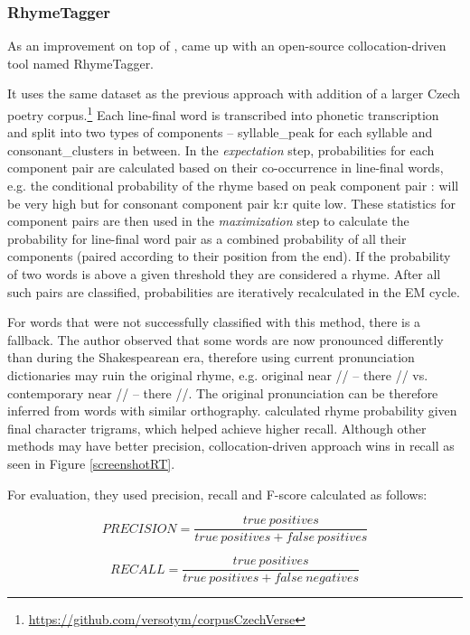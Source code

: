 \subsubsection*{RhymeTagger}
As an improvement on top of \cite{reddy2011unsupervised}, \cite{plechavc2018collocation} came up with an open-source collocation-driven tool named RhymeTagger.

It uses the same dataset as the previous approach with addition of a larger Czech poetry corpus.\footnote{\url{https://github.com/versotym/corpusCzechVerse}}
Each line-final word is transcribed into phonetic transcription and split into two types of components -- \gls{syllable_peak} for each syllable and \gls{consonant_clusters} in between. In the \textit{expectation} step, probabilities for each component pair are calculated based on their co-occurrence in line-final words, e.g. the conditional probability of the rhyme based on peak component pair : will be very high but for consonant component pair k:r quite low. These statistics for component pairs are then used in the \textit{maximization} step to calculate the probability for line-final word pair as a combined probability of all their components (paired according to their position from the end). If the probability of two words is above a given threshold they are considered a rhyme. After all such pairs are classified, probabilities are iteratively recalculated in the EM cycle. 

For words that were not successfully classified with this method, there is a fallback. The author observed that some words are now pronounced differently than during the Shakespearean era, therefore using current pronunciation dictionaries may ruin the original rhyme, e.g. original near // -- there // vs. contemporary near // -- there //. The original pronunciation can be therefore inferred from words with similar orthography. \citeauthor{plechavc2018collocation} calculated rhyme probability given final character trigrams, which helped achieve higher recall. Although other methods may have better precision, collocation-driven approach wins in recall as seen in Figure \ref{screenshotRT}. 

For evaluation, they used precision, recall and F-score calculated as follows:

\[PRECISION=\frac{true\ positives}{true\ positives+false\ positives}\]

\[RECALL=\frac{true\ positives}{true\ positives+false\ negatives}\]


